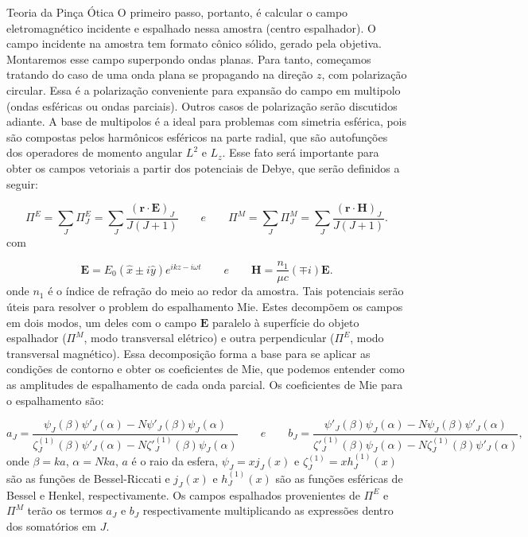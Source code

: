 \begin{chapter}{Teoria da Pinça Ótica}
O primeiro passo, portanto, é calcular o campo eletromagnético incidente e espalhado nessa amostra (centro espalhador). O campo incidente na amostra tem formato cônico sólido, gerado pela objetiva. Montaremos esse campo superpondo ondas planas. Para tanto, começamos tratando do caso de uma onda plana se propagando na direção $z$, com polarização circular. Essa é a polarização conveniente para expansão do campo em multipolo (ondas esféricas ou ondas parciais). Outros casos de polarização serão discutidos adiante. A base de multipolos é a ideal para problemas com simetria esférica, pois são compostas pelos harmônicos esféricos na parte radial, que são autofunções dos operadores de momento angular $L^2$ e $L_z$. Esse fato será importante para obter os campos vetoriais a partir dos potenciais de Debye, que serão definidos a seguir: 

\begin{equation}
\Pi^{E}=\sum\limits_{J} \Pi^{E}_J=\sum\limits_{J}\frac{ ({\mathbf r}\cdot{\mathbf E })_J }{J(J+1)} \qquad e\qquad \Pi^{M}=\sum\limits_{J} \Pi^{M}_J=\sum\limits_{J}\frac{ ({\mathbf r}\cdot{\mathbf H })_J }{J(J+1)} .
\label{debye_def}
\end{equation}
%
com

\begin{equation}
{\mathbf E}=E_0(\hat{x}\pm i \hat{y})e^{ikz-i\omega t} \qquad e\qquad {\mathbf H}=\frac{n_1}{\mu c}(\mp i){\mathbf E}.
\label{onda_plana}
\end{equation}
%
onde $n_1$ é o índice de refração do meio ao redor da amostra. Tais potenciais serão úteis para resolver o problem do espalhamento Mie. Estes decompõem os campos em dois modos, um deles com o campo ${\mathbf E}$ paralelo à superfície do objeto espalhador ($\Pi^{M}$, modo transversal elétrico) e outra perpendicular ($\Pi^{E}$, modo transversal magnético). Essa decomposição forma a base para se aplicar as condições de contorno e obter os coeficientes de Mie, que podemos entender como as amplitudes de espalhamento de cada onda parcial. Os coeficientes de Mie para o espalhamento são:

\begin{equation}
a_J=\frac{\psi_J(\beta)\psi'_J(\alpha)-N\psi'_J(\beta)\psi_J(\alpha)}{\zeta^{(1)}_J(\beta)\psi'_J(\alpha)-N\zeta'^{(1)}_J(\beta)\psi_J(\alpha)} \qquad e\qquad
b_J=\frac{\psi'_J(\beta)\psi_J(\alpha)-N\psi_J(\beta)\psi'_J(\alpha)}{\zeta'^{(1)}_J(\beta)\psi_J(\alpha)-N\zeta^{(1)}_J(\beta)\psi'_J(\alpha)},
\label{mie}
\end{equation} 
%
onde $\beta=ka$, $\alpha=Nka$, $a$ é o raio da esfera, $\psi_J=xj_J(x)$ e $\zeta^{(1)}_J=xh^{(1)}_J(x)$ são as funções de Bessel-Riccati e $j_J(x)$ e $h^{(1)}_J(x)$ são as funções esféricas de Bessel e Henkel, respectivamente. Os campos espalhados provenientes de $\Pi^E$ e $\Pi^M$ terão os termos $a_J$ e $b_J$ respectivamente multiplicando as expressões dentro dos somatórios em $J$.


\end{chapter}
